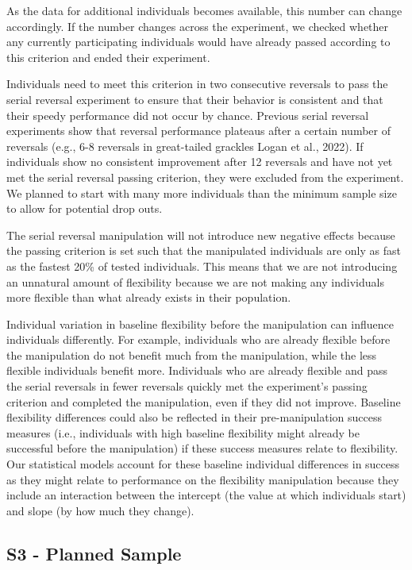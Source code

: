 \documentclass[
]{article}
\begin{document}
As the data for additional individuals becomes available, this number
can change accordingly. If the number changes across the experiment, we
checked whether any currently participating individuals would have
already passed according to this criterion and ended their experiment.

Individuals need to meet this criterion in two consecutive reversals to
pass the serial reversal experiment to ensure that their behavior is
consistent and that their speedy performance did not occur by chance.
Previous serial reversal experiments show that reversal performance
plateaus after a certain number of reversals (e.g., 6-8 reversals in
great-tailed grackles Logan et al., 2022). If individuals show no
consistent improvement after 12 reversals and have not yet met the
serial reversal passing criterion, they were excluded from the
experiment. We planned to start with many more individuals than the
minimum sample size to allow for potential drop outs.

The serial reversal manipulation will not introduce new negative effects
because the passing criterion is set such that the manipulated
individuals are only as fast as the fastest 20\% of tested individuals.
This means that we are not introducing an unnatural amount of
flexibility because we are not making any individuals more flexible than
what already exists in their population.

Individual variation in baseline flexibility before the manipulation can
influence individuals differently. For example, individuals who are
already flexible before the manipulation do not benefit much from the
manipulation, while the less flexible individuals benefit more.
Individuals who are already flexible and pass the serial reversals in
fewer reversals quickly met the experiment's passing criterion and
completed the manipulation, even if they did not improve. Baseline
flexibility differences could also be reflected in their
pre-manipulation success measures (i.e., individuals with high baseline
flexibility might already be successful before the manipulation) if
these success measures relate to flexibility. Our statistical models
account for these baseline individual differences in success as they
might relate to performance on the flexibility manipulation because they
include an interaction between the intercept (the value at which
individuals start) and slope (by how much they change).

\subsection{S3 - Planned Sample}\label{s3---planned-sample}
\end{document}
